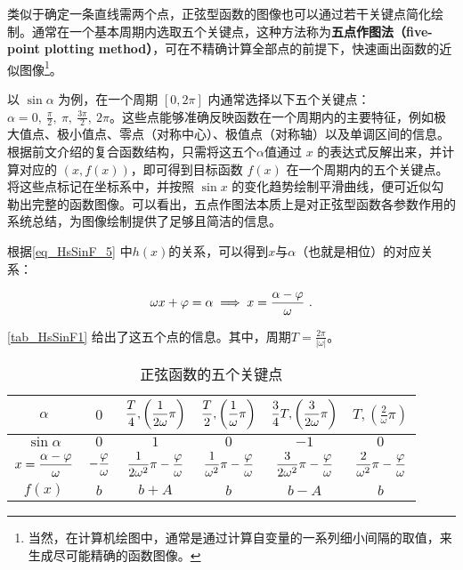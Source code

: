 类似于确定一条直线需两个点，正弦型函数的图像也可以通过若干关键点简化绘制。通常在一个基本周期内选取五个关键点，这种方法称为\textbf{五点作图法（five-point plotting method）}，可在不精确计算全部点的前提下，快速画出函数的近似图像\footnote{当然，在计算机绘图中，通常是通过计算自变量的一系列细小间隔的取值，来生成尽可能精确的函数图像。}。

以 $\sin \alpha$ 为例，在一个周期 $[0, 2\pi]$ 内通常选择以下五个关键点：$\displaystyle\alpha = 0,\ \frac{\pi}{2},\ \pi,\ \frac{3\pi}{2},\ 2\pi$。这些点能够准确反映函数在一个周期内的主要特征，例如极大值点、极小值点、零点（对称中心）、极值点（对称轴）以及单调区间的信息。根据前文介绍的复合函数结构，只需将这五个$\alpha$值通过 $x$ 的表达式反解出来，并计算对应的 $(x, f(x))$，即可得到目标函数 $f(x)$ 在一个周期内的五个关键点。将这些点标记在坐标系中，并按照 $\sin x$ 的变化趋势绘制平滑曲线，便可近似勾勒出完整的函数图像。可以看出，五点作图法本质上是对正弦型函数各参数作用的系统总结，为图像绘制提供了足够且简洁的信息。

根据\autoref{eq_HsSinF_5} 中$h(x)$的关系，可以得到$x$与$\alpha$（也就是相位）的对应关系：

\begin{equation}
\omega x + \varphi=\alpha\implies x={\alpha-\varphi\over \omega}~.
\end{equation}

\autoref{tab_HsSinF1} 给出了这五个点的信息。其中，周期$\displaystyle T = \frac{2\pi}{|\omega|}$。

\begin{table}[ht]
\centering
\caption{正弦函数的五个关键点}\label{tab_HsSinF1}
\begin{tabular}{|c|c|c|c|c|c|}
\hline
$\alpha$ & $0$ &$\displaystyle {T\over4},\left(\frac{1}{2\omega}\pi\right)$& $\displaystyle {T\over2},\left(\frac{1}{\omega}\pi\right)$ & $\displaystyle {3\over4}T,\left(\frac{3}{2\omega}\pi\right)$ & $\displaystyle T,\left(\frac{2}{\omega}\pi\right)$\\
\hline
$\sin \alpha$ & $0$&$1$&$0$&$-1$&$0$ \\
\hline
$x=\displaystyle{\alpha-\varphi\over \omega}$&$\displaystyle-{\varphi\over \omega}$&$\displaystyle{1\over 2\omega^2}\pi-{\varphi\over \omega}$&$\displaystyle{1\over \omega^2}\pi-{\varphi\over \omega}$&$\displaystyle{3\over 2\omega^2}\pi-{\varphi\over \omega}$&$\displaystyle{2\over \omega^2}\pi-{\varphi\over \omega}$\\
\hline
$f(x)$ & $b$&$b+A$&$b$&$b-A$&$b$ \\
\hline
\end{tabular}
\end{table}

